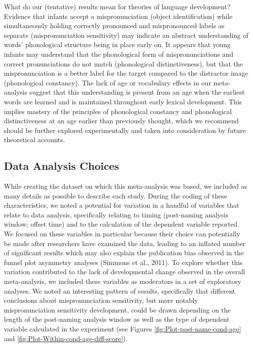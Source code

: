 \documentclass[man]{apa6}
\theoremstyle{definition}
\theoremstyle{definition}
\theoremstyle{definition}
\theoremstyle{remark}
\begin{document}
What do our (tentative) results mean for theories of language
development? Evidence that infants accept a mispronunciation (object
identification) while simultaneously holding correctly pronounced and
mispronounced labels as separate (mispronunciation sensitivity) may
indicate an abstract understanding of words' phonological structure
being in place early on. It appears that young infants may understand
that the phonological form of mispronunciations and correct
pronunciations do not match (phonological distinctiveness), but that the
mispronunciation is a better label for the target compared to the
distractor image (phonological constancy). The lack of age or vocabulary
effects in our meta-analysis suggest that this understanding is present
from an age when the earliest words are learned and is maintained
throughout early lexical development. This implies mastery of the
principles of phonological constancy and phonological distinctiveness at
an age earlier than previously thought, which we recommend should be
further explored experimentally and taken into consideration by future
theoretical accounts.

\subsection{Data Analysis Choices}\label{data-analysis-choices}

While creating the dataset on which this meta-analysis was based, we
included as many details as possible to describe each study. During the
coding of these characteristics, we noted a potential for variation in a
handful of variables that relate to data analysis, specifically relating
to timing (post-naming analysis window; offset time) and to the
calculation of the dependent variable reported. We focused on these
variables in particular because their choice can potentially be made
after researchers have examined the data, leading to an inflated number
of significant results which may also explain the publication bias
observed in the funnel plot asymmetry analyses (Simmons et al., 2011).
To explore whether this variation contributed to the lack of
developmental change observed in the overall meta-analysis, we included
these variables as moderators in a set of exploratory analyses. We noted
an interesting pattern of results, specifically that different
conclusions about mispronunciation sensitivity, but more notably
mispronunciation sensitivity development, could be drawn depending on
the length of the post-naming analysis window as well as the type of
dependent variable calculated in the experiment (see Figures
\ref{fig:Plot-post-name-cond-age} and
\ref{fig:Plot-Within-cond-age-diff-score}).
\end{document}
